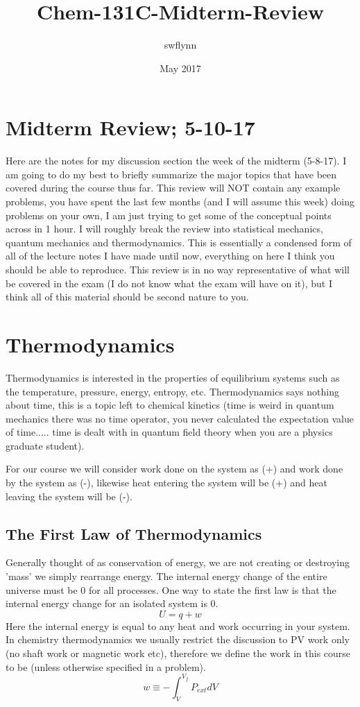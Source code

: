 \documentclass{article}
\title{Chem-131C-Midterm-Review}
\author{swflynn }
\date{May 2017}
\begin{document}
\maketitle

\section*{Midterm Review; 5-10-17}
Here are the notes for my discussion section the week of the midterm (5-8-17). 
I am going to do my best to briefly summarize the major topics that have been covered during the course thus far. 
This review will NOT contain any example problems, you have spent the last few months (and I will assume this week) doing problems on your own, I am just trying to get some of the conceptual points across in 1 hour. 
I will roughly break the review into statistical mechanics, quantum mechanics and thermodynamics. 
This is essentially a condensed form of all of the lecture notes I have made until now, everything on here I think you should be able to reproduce.
This review is in no way representative of what will be covered in the exam (I do not know what the exam will have on it), but I think all of this material should be second nature to you.

\section{Thermodynamics}
Thermodynamics is interested in the properties of equilibrium systems such as the temperature, pressure, energy, entropy, etc. 
Thermodynamics says nothing about time, this is a topic left to chemical kinetics (time is weird in quantum mechanics there was no time operator, you never calculated the expectation value of time..... time is dealt with in quantum field theory when you are a physics graduate student). 

For our course we will consider work done on the system as (+) and work done by the system as (-), likewise heat entering the system will be (+) and heat leaving the system will be (-). 

\subsection{The First Law of Thermodynamics}
Generally thought of as conservation of energy, we are not creating or destroying 'mass' we simply rearrange energy. 
The internal energy change of the entire universe must be 0 for all processes. 
One way to state the first law is that the internal energy change for an isolated system is 0.
\begin{equation}
    U = q + w
\end{equation}
Here the internal energy is equal to any heat and work occurring in your system. 
In chemistry thermodynamics we usually restrict the discussion to PV work only (no shaft work or magnetic work etc), therefore we define the work in this course to be (unless otherwise specified in a problem). 
\begin{equation}
    w \equiv -\int_V^{V_f} P_{ext}dV
\end{equation}
\end{document}
